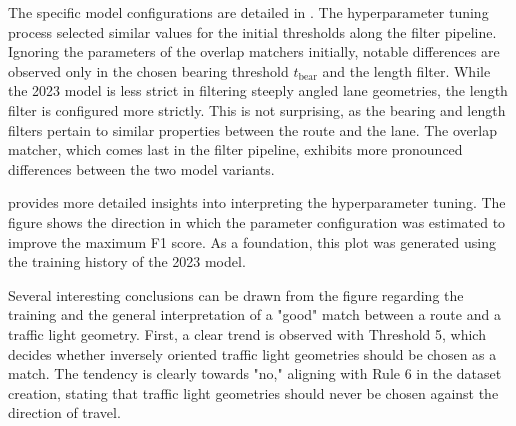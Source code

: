 \begin{table}[t]
\caption{Tuned hyperparameters for the algorithmic matching model.}
\label{tab:hyperparameter-tuning-results}
\end{table}

The specific model configurations are detailed in . The hyperparameter tuning process selected similar values for the initial thresholds along the filter pipeline. Ignoring the parameters of the overlap matchers initially, notable differences are observed only in the chosen bearing threshold $t_{\text{bear}}$ and the length filter. While the 2023 model is less strict in filtering steeply angled lane geometries, the length filter is configured more strictly. This is not surprising, as the bearing and length filters pertain to similar properties between the route and the lane. The overlap matcher, which comes last in the filter pipeline, exhibits more pronounced differences between the two model variants. 

 provides more detailed insights into interpreting the hyperparameter tuning. The figure shows the direction in which the parameter configuration was estimated to improve the maximum F1 score. As a foundation, this plot was generated using the training history of the 2023 model.

Several interesting conclusions can be drawn from the figure regarding the training and the general interpretation of a "good" match between a route and a traffic light geometry. First, a clear trend is observed with Threshold 5, which decides whether inversely oriented traffic light geometries should be chosen as a match. The tendency is clearly towards "no," aligning with Rule 6 in the dataset creation, stating that traffic light geometries should never be chosen against the direction of travel. 

